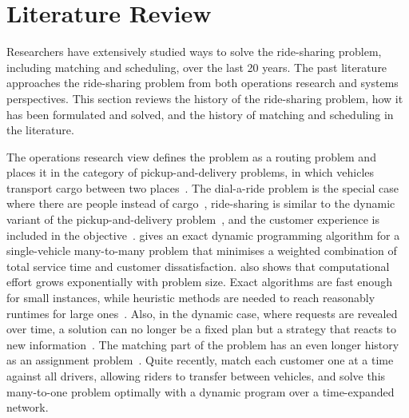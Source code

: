 \section{Literature Review}
\label{sec:literature-review}

Researchers have extensively studied ways to solve the ride-sharing problem, including matching and scheduling, over the last 20 years. The past literature approaches the ride-sharing problem from both operations research and systems perspectives. This section reviews the history of the ride-sharing problem, how it has been formulated and solved, and the history of matching and scheduling in the literature. 

The operations research view defines the problem as a routing problem and places it in the category of pickup-and-delivery problems, in which vehicles transport cargo between two places~\citep{savelsbergh1995general}. The dial-a-ride problem is the special case where there are people instead of cargo~\citep{savelsbergh1995general}, ride-sharing is similar to the dynamic variant of the pickup-and-delivery problem~\citep{furuhata2013ridesharing}, and the customer experience is included in the objective~\citep{cordeau2007dialaride}. \citet{psaraftis1980dynamic} gives an exact dynamic programming algorithm for a single-vehicle many-to-many problem that minimises a weighted combination of total service time and customer dissatisfaction. \citet{psaraftis1980dynamic} also shows that computational effort grows exponentially with problem size. Exact algorithms are fast enough for small instances, while heuristic methods are needed to reach reasonably runtimes for large ones~\citep{cordeau2007dialaride}. Also, in the dynamic case, where requests are revealed over time, a solution can no longer be a fixed plan but a strategy that reacts to new information~\citep{berbeglia2010dynamic}. The matching part of the problem has an even longer history as an assignment problem~\citep{pentico2007assignment}. Quite recently, \citet{masoud2017realtime} match each customer one at a time against all drivers, allowing riders to transfer between vehicles, and solve this many-to-one problem optimally with a dynamic program over a time-expanded network.


